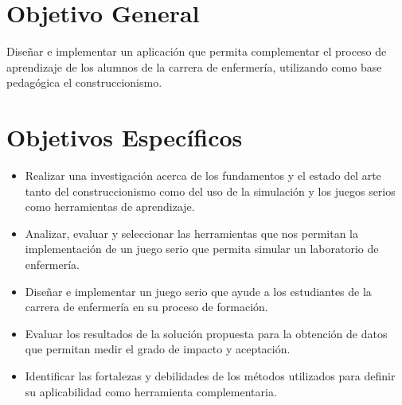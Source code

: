 \section{Objetivo General}

Diseñar e implementar un aplicación que permita complementar el proceso de
aprendizaje de los alumnos de la carrera de enfermería, utilizando como base
pedagógica el construccionismo.


\section{Objetivos Específicos}

\begin{itemize}
\item Realizar una investigación acerca de los fundamentos y el estado del arte
    tanto del construccionismo como del uso de la simulación y los juegos serios
    como herramientas de aprendizaje.

\item Analizar, evaluar y seleccionar las herramientas que nos permitan la
    implementación de un juego serio que permita simular un laboratorio de
    enfermería.

\item Diseñar e implementar un juego serio que ayude a los estudiantes de la
    carrera de enfermería en su proceso de formación.

\item Evaluar los resultados de la solución propuesta para la obtención de datos
    que permitan medir el grado de impacto y aceptación.

\item Identificar las fortalezas y debilidades de los métodos utilizados para
    definir su aplicabilidad como herramienta complementaria. 

\end{itemize}
